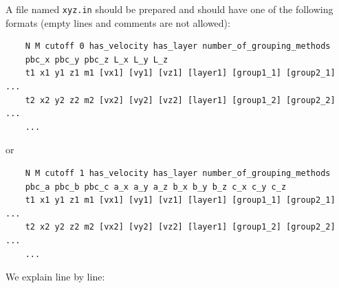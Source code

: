 \documentclass[12pt,a4paper]{report}
\begin{document}
A file named \verb"xyz.in" should be prepared and should have one of the following formats (empty lines and comments are not allowed):
\begin{verbatim}
    N M cutoff 0 has_velocity has_layer number_of_grouping_methods
    pbc_x pbc_y pbc_z L_x L_y L_z
    t1 x1 y1 z1 m1 [vx1] [vy1] [vz1] [layer1] [group1_1] [group2_1] ...
    t2 x2 y2 z2 m2 [vx2] [vy2] [vz2] [layer1] [group1_2] [group2_2] ...
    ...
\end{verbatim}
or
\begin{verbatim}
    N M cutoff 1 has_velocity has_layer number_of_grouping_methods
    pbc_a pbc_b pbc_c a_x a_y a_z b_x b_y b_z c_x c_y c_z
    t1 x1 y1 z1 m1 [vx1] [vy1] [vz1] [layer1] [group1_1] [group2_1] ...
    t2 x2 y2 z2 m2 [vx2] [vy2] [vz2] [layer1] [group1_2] [group2_2] ...
    ...
\end{verbatim}
We explain line by line:
\end{document}
